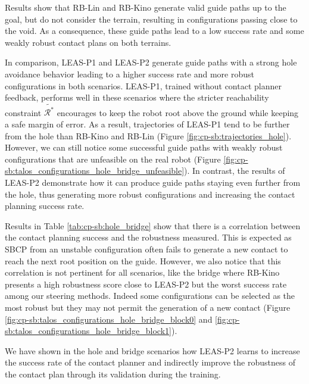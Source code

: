 Results show that RB-Lin and RB-Kino generate valid guide paths up to the goal, but do not consider the terrain, resulting in configurations passing close to the void. As a consequence, these guide paths lead to a low success rate and some weakly robust contact plans on both terrains.

In comparison, LEAS-P1 and LEAS-P2 generate guide paths with a strong hole avoidance behavior leading to a higher success rate and more robust configurations in both scenarios.
LEAS-P1, trained without contact planner feedback, performs well in these scenarios where the stricter reachability constraint $\tilde{\mathcal{R}^*}$ encourages to keep the robot root above the ground while keeping a safe margin of error. 
As a result, trajectories of LEAS-P1 tend to be further from the hole than RB-Kino and RB-Lin (Figure \ref{fig:cp-sb:trajectories_hole}). 
However, we can still notice some successful guide paths with weakly robust configurations that are unfeasible on the real robot (Figure \ref{fig:cp-sb:talos_configurations_hole_bridge_unfeasible}).
In contrast, the results of LEAS-P2 demonstrate how it can produce guide paths staying even further from the hole, thus generating more robust configurations and increasing the contact planning success rate.

Results in Table \ref{tab:cp-sb:hole_bridge} show that there is a correlation between the contact planning success and the robustness measured. This is expected as SBCP from an unstable configuration often fails to generate a new contact to reach the next root position on the guide.
However, we also notice that this correlation is not pertinent for all scenarios, like the bridge where RB-Kino presents a high robustness score close to LEAS-P2 but the worst success rate among our steering methods. 
Indeed some configurations can be selected as the most robust but they may not permit the generation of a new contact (Figure \ref{fig:cp-sb:talos_configurations_hole_bridge_block0} and \ref{fig:cp-sb:talos_configurations_hole_bridge_block1}).

We have shown in the hole and bridge scenarios how LEAS-P2 learns to increase the success rate of the contact planner and indirectly improve the robustness of the contact plan through its validation during the training.


